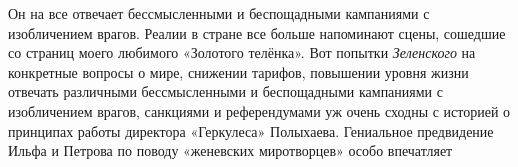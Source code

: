 Он на все отвечает бессмысленными и беспощадными кампаниями с изобличением
врагов.  Реалии в стране все больше напоминают сцены, сошедшие со страниц моего
любимого «Золотого телёнка». Вот попытки \emph{Зеленского} на конкретные вопросы о
мире, снижении тарифов, повышении уровня жизни отвечать различными
бессмысленными и беспощадными кампаниями с изобличением врагов, санкциями и
референдумами уж очень сходны с историей о принципах работы директора
«Геркулеса» Полыхаева.  Гениальное предвидение Ильфа и Петрова по поводу
«женевских миротворцев» особо впечатляет

